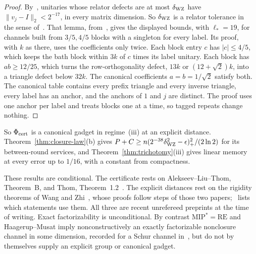 \begin{proof}
By~\cite[Theorem~D.4]{MghirbiDouglasD}, unitaries whose relator defects are at most
$\delta_{\rm WZ}$ have $\|v_j-I\|_2<2^{-17}$, in every matrix dimension. So $\delta_{\rm WZ}$ is a
relator tolerance in the sense of~\cite[Lemma~7.3]{MghirbiDouglasD}. That lemma, from~\cite[Theorem~6]{MghirbiDouglasDv1},
gives the displayed bounds, with $\ell_*=19$, for channels built from $3/5,4/5$ blocks with a
singleton for every label. Its proof, with $k$ as there, uses the coefficients only twice. Each block
entry $c$ has $|c|\le4/5$, which keeps the bath block within $3k$ of $c$ times its label unitary. Each
block has $ab\ge12/25$, which turns the row-orthogonality defect, $13k$ or $(12+\sqrt2)k$, into a
triangle defect below $32k$. The canonical coefficients $a=b=1/\sqrt2$ satisfy both. The canonical
table contains every prefix triangle and every inverse triangle, every label has an anchor, and the
anchors of $1$ and $j$ are distinct. The proof uses one anchor per label and treats blocks one at a
time, so tagged repeats change nothing.
\end{proof}

So $\Phi_{\rm cert}$ is a canonical gadget in regime~(iii) at an explicit distance.
Theorem~\ref{thm:closure-law}(b) gives
$P+C\ge n(2^{-38}\delta_{\rm WZ}^2-\epsilon)_+^2/(2\ln2)$ for its between-round services, and
Theorem~\ref{thm:trichotomy}(iii) gives linear memory at every error up to $1/16$, with a constant
from compactness.

These results are conditional. The certificate rests on Alekseev--Liu--Thom, Theorem~B, and Thom,
Theorem~1.2~\cite{AlekseevLiuThom2026,Thom2026}. The explicit distances rest on the rigidity theorems
of Wang and Zhi~\cite{WangZhi2026}, whose proofs follow steps of those two
papers;~\cite[Section~1.4]{MghirbiDouglasD} lists which statements use them. All three are recent
unrefereed preprints at the time of writing. Exact factorizability is unconditional. By contrast
$\mathrm{MIP}^*=\mathrm{RE}$ and Haagerup--Musat imply nonconstructively an exactly factorizable
nonclosure channel in some dimension, recorded for a Schur channel
in~\cite[Corollary~3.11]{Musat2025}, but do not by themselves supply an explicit group or canonical
gadget.
